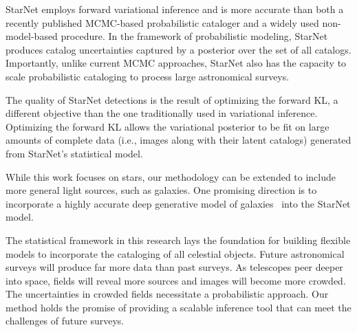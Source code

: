 StarNet employs forward variational inference and is more accurate than both a recently published MCMC-based probabilistic cataloger and a widely used non-model-based
procedure.
In the framework of probabilistic modeling,
StarNet produces catalog uncertainties captured by a posterior over the set of all catalogs.
Importantly, unlike current MCMC approaches, StarNet also has the capacity to scale probabilistic cataloging to process large astronomical surveys.

The quality of StarNet detections is the result of optimizing the forward KL, a different objective than the one traditionally used in variational inference.
Optimizing the forward KL allows the variational posterior to be fit on large amounts of complete data (i.e., images along with their latent catalogs) generated from StarNet's statistical model.

While this work focuses on stars, our methodology can be extended to
include more general light sources, such as galaxies.
One promising direction is to incorporate a highly accurate deep generative model of galaxies~\citep{Regier2015ADG, Reiman_2019_gans_deblend, lanusse2020deep, Arcelin_2020} into the StarNet model.

The statistical framework in this research lays the foundation for building flexible models to incorporate the cataloging of all celestial objects.
Future astronomical surveys will produce far more data than past surveys.
As telescopes peer deeper into space, fields will reveal more sources and images will become more crowded.
The uncertainties in crowded fields necessitate a probabilistic approach.
Our method holds the promise of providing  a scalable inference tool that can meet the challenges of future surveys.

